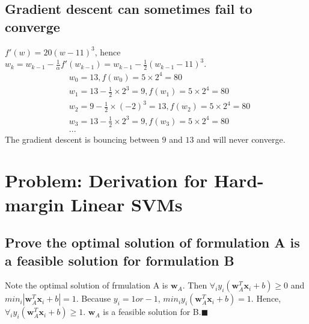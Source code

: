 \documentclass{article}
\begin{document}
	\subsection{Gradient descent can sometimes fail to converge}
	$f'(w)=20(w-11)^3$, hence $w_k=w_{k-1}-\frac 1 \alpha f'(w_{k-1})=w_{k-1}-\frac 1 2 (w_{k-1}-11)^3$.
	\[\begin{split}
		&w_0=13, f(w_0)=5\times2^4=80\\
		&w_1=13-\frac 1 2\times 2^3=9, f(w_1)=5\times2^4=80\\
		&w_2=9-\frac 1 2\times (-2)^3=13, f(w_2)=5\times2^4=80\\
		&w_3=13-\frac 1 2\times 2^3=9, f(w_3)=5\times2^4=80\\
		&...
	\end{split}\]
	The gradient descent is bouncing between $9$ and $13$ and will never converge.
	\begin{center}
		\end{center}
	
	\section{Problem: Derivation for Hard-margin Linear SVMs}
	\subsection{Prove the optimal solution of formulation A is a feasible solution for formulation B}
	Note the optimal solution of frmulation A is $\textbf{w}_A$. Then $\forall_iy_i(\textbf{w}_A^T\textbf{x}_i+b)\geq 0$ and $min_i|\textbf{w}_A^T\textbf{x}_i+b|=1$. Because $y_i=1or-1$, $min_iy_i(\textbf{w}_A^T\textbf{x}_i+b)=1$. Hence, $\forall_iy_i(\textbf{w}_A^T\textbf{x}_i+b)\geq 1$. $\textbf{w}_A$ is a feasible solution for B.$\blacksquare$
\end{document}
